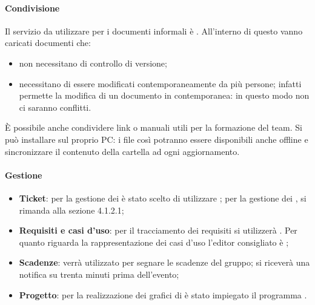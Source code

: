 	\paragraph{Condivisione}
	\label{sec:4.1.4.2}
		Il servizio da utilizzare per i documenti informali è .
		All'interno di questo  vanno caricati documenti che:
		\begin{itemize}
			\item non necessitano di controllo di versione;
			\item necessitano di essere modificati contemporaneamente da più persone; infatti  permette la modifica di un documento in contemporanea: in questo modo non ci saranno conflitti.
		\end{itemize}
		È possibile anche condividere link o manuali utili per la formazione del team. Si può installare  sul proprio PC: i file così potranno essere disponibili anche offline e sincronizzare il contenuto della cartella ad ogni aggiornamento.
	\paragraph{Gestione}
	\label{sec:4.1.4.3}
		\begin{itemize}
			\item \textbf{Ticket}: per la gestione dei  è stato scelto di utilizzare ; per la gestione dei , si rimanda alla sezione 4.1.2.1;
			\item \textbf{Requisiti e casi d'uso}: per il tracciamento dei requisiti si utilizzerà . Per quanto riguarda la rappresentazione dei casi d'uso l'editor consigliato è ; %
			\item \textbf{Scadenze}:  verrà utilizzato per segnare le scadenze del gruppo; si riceverà una notifica su  trenta minuti prima dell'evento;
			\item \textbf{Progetto}: per la realizzazione dei grafici di  è stato impiegato il programma .
		\end{itemize}